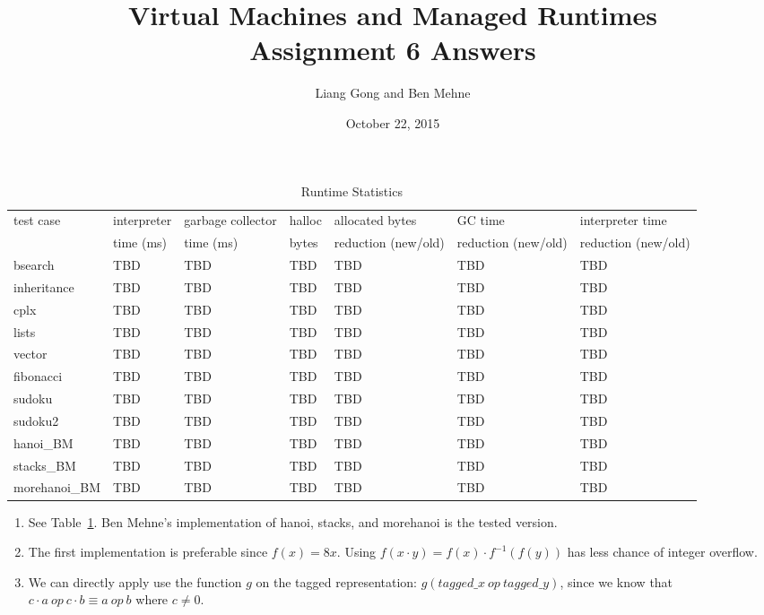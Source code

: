 \documentclass[notitlepage]{report}
\title{\vspace{-0.5in}Virtual Machines and Managed Runtimes \\ Assignment 6 Answers}
\date{\vspace{-0.5in}October 22, 2015}
\author{\vspace{-0.5in}Liang Gong and Ben Mehne\vspace{-0.5in}}
\newcommand{\code}[1]{{\ttfamily #1}}
\begin{document}
\maketitle

\begin{table}[!htp]
\centering
\caption{Runtime Statistics}
\label{statistics}
{\footnotesize
\begin{tabular}{lllllll}
\toprule
test case & interpreter & garbage collector & \code{halloc} & allocated bytes     & GC time             & interpreter time    \\
          & time (ms)   & time (ms)         & bytes         & reduction (new/old) & reduction (new/old) & reduction (new/old) \\
\midrule
bsearch        & TBD          & TBD          & TBD           & TBD          & TBD           & TBD           \\
inheritance    & TBD          & TBD          & TBD           & TBD          & TBD           & TBD           \\
cplx           & TBD          & TBD          & TBD           & TBD          & TBD           & TBD           \\
lists          & TBD          & TBD          & TBD           & TBD          & TBD           & TBD           \\
vector         & TBD          & TBD          & TBD           & TBD          & TBD           & TBD           \\
fibonacci      & TBD          & TBD          & TBD           & TBD          & TBD           & TBD           \\
sudoku         & TBD          & TBD          & TBD           & TBD          & TBD           & TBD           \\
sudoku2        & TBD          & TBD          & TBD           & TBD          & TBD           & TBD           \\
hanoi\_BM      & TBD          & TBD          & TBD           & TBD          & TBD           & TBD           \\
stacks\_BM     & TBD          & TBD          & TBD           & TBD          & TBD           & TBD           \\
morehanoi\_BM  & TBD          & TBD          & TBD           & TBD          & TBD           & TBD           \\

\bottomrule
\end{tabular}
}
\end{table}

\begin{enumerate}
	\item
		See Table~\ref{statistics}. Ben Mehne's implementation of hanoi, stacks, and morehanoi is the tested version.
	\item
		The first implementation is preferable since $f(x) = 8x$. Using $f(x \cdot y) = f(x) \cdot f^{-1}(f(y))$ has less chance
		of integer overflow.
	\item
		We can directly apply use the function $g$ on the tagged representation: $g (tagged\_x\ op\ tagged\_y)$, since we know that $c \cdot a\ op\ c \cdot b \equiv a\ op\ b$ where $c \neq 0$.
\end{enumerate}
\end{document}
